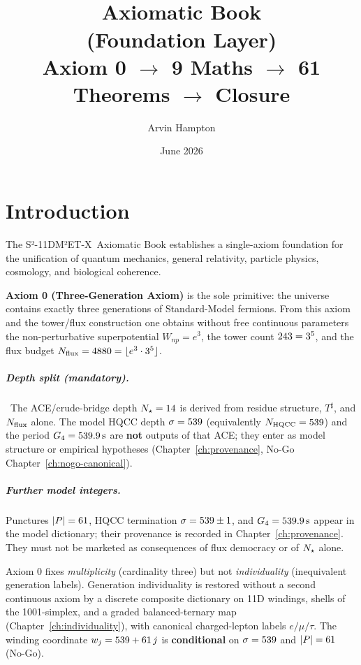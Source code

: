 \documentclass[11pt,a4paper]{book}
\title{\textbf{\model} \\ Axiomatic Book \\ (Foundation Layer) \\ Axiom 0 $\to$ 9 Maths $\to$ 61 Theorems $\to$ Closure}
\author{Arvin Hampton}
\date{June 2026}
\theoremstyle{remark}
\theoremstyle{definition}
\newcommand{\model}{S²-11DM²ET-X}
\begin{document}
\maketitle
\tableofcontents
\newpage

\chapter{Introduction}

The \model\ Axiomatic Book establishes a single-axiom foundation for the unification of quantum mechanics, general relativity, particle physics, cosmology, and biological coherence.

\textbf{Axiom 0 (Three-Generation Axiom)} is the sole primitive: the universe contains exactly three generations of Standard-Model fermions. From this axiom and the tower/flux construction one obtains without free continuous parameters the non-perturbative superpotential \(W_{np}=e^3\), the tower count \(243=3^5\), and the flux budget \(N_{\mathrm{flux}}=4880=\lfloor e^3\cdot 3^5\rfloor\).

\paragraph{Depth split (mandatory).}
\DepthSplitReminder\
The ACE/crude-bridge depth \(N_{\star}=14\) is derived from residue structure, \(T^\sharp\), and \(N_{\mathrm{flux}}\) alone. The model HQCC depth \(\sigma=539\) (equivalently \(N_{\mathrm{HQCC}}=539\)) and the period \(G_{4}=539.9\,\mathrm{s}\) are \textbf{not} outputs of that ACE; they enter as model structure or empirical hypotheses (Chapter~\ref{ch:provenance}, No-Go Chapter~\ref{ch:nogo-canonical}).

\paragraph{Further model integers.}
Punctures \(|P|=61\), HQCC termination \(\sigma=539\pm 1\), and \(G_{4}=539.9\,\mathrm{s}\) appear in the model dictionary; their provenance is recorded in Chapter~\ref{ch:provenance}. They must not be marketed as consequences of flux democracy or of \(N_{\star}\) alone.

Axiom 0 fixes \emph{multiplicity} (cardinality three) but not \emph{individuality} (inequivalent generation labels). Generation individuality is restored without a second continuous axiom by a discrete composite dictionary on 11D windings, shells of the 1001-simplex, and a graded balanced-ternary map (Chapter~\ref{ch:individuality}), with canonical charged-lepton labels \(e/\mu/\tau\). The winding coordinate \(w_j=539+61\, j\) is \textbf{conditional} on \(\sigma=539\) and \(|P|=61\) (No-Go).
\end{document}
